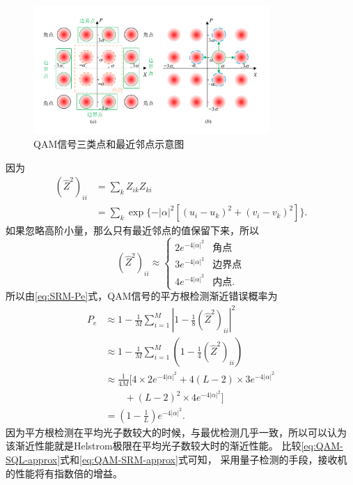\begin{figure}
\centering
  \includegraphics[width=0.8\textwidth]{figures/chap3/QAM-nearbor}
  \caption{QAM信号三类点和最近邻点示意图}
  \label{fig:QAM-nearbor}
\end{figure}

因为
\begin{equation}
\begin{split}
(\hat{Z}^2)_{ii} &= \sum_k Z_{ik}Z_{ki}    \\
                 &=\sum_k \exp\{- |\alpha|^2 [(u_i-u_k)^2 + (v_i-v_k)^2]\}.
\end{split}
\end{equation}
如果忽略高阶小量，那么只有最近邻点的值保留下来，所以
\begin{equation}
(\hat{Z}^2)_{ii} \approx \begin{cases}
                            2 e^{- 4|\alpha|^2} & \text{角点} \\
                            3 e^{- 4|\alpha|^2} & \text{边界点} \\
                            4 e^{- 4|\alpha|^2} & \text{内点} .
                         \end{cases}
\end{equation}
所以由\ref{eq:SRM-Pe}式，QAM信号的平方根检测渐近错误概率为
\begin{equation}
\begin{split}
P_e & \approx 1 - \frac{1}{M}\sum_{i=1}^M |1 - \frac{1}{8} (\hat{Z}^2)_{ii}|^2 \\
   & \approx 1 - \frac{1}{M}\sum_{i=1}^M (1 - \frac{1}{4} (\hat{Z}^2)_{ii}) \\
   & \approx  \frac{1}{4M} [4\times 2e^{- 4|\alpha|^2} + 4(L-2) \times 3e^{- 4|\alpha|^2} \\
   & \qquad  + (L-2)^2 \times 4e^{- 4|\alpha|^2}] \\
   & =      (1 - \frac{1}{L})  e^{- 4|\alpha|^2}. 
\label{eq:QAM-SRM-approx}   
\end{split}
\end{equation}
因为平方根检测在平均光子数较大的时候，与最优检测几乎一致，所以可以认为
该渐近性能就是Helstrom极限在平均光子数较大时的渐近性能。
比较\ref{eq:QAM-SQL-approx}式和\ref{eq:QAM-SRM-approx}式可知，
采用量子检测的手段，接收机的性能将有指数倍的增益。

